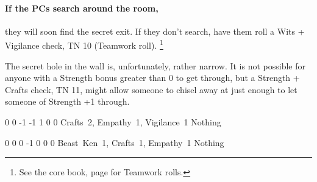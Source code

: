 \begin{multicols}{2}
\paragraph{If the PCs search around the room,}
they will soon find the secret exit.
If they don't search, have them roll a Wits + Vigilance check, TN 10 (Teamwork roll).%
\footnote{See the core book, page \pageref{teamwork} for Teamwork rolls.}

The secret hole in the wall is, unfortunately, rather narrow.
It is not possible for anyone with a Strength bonus greater than 0 to get through, but a Strength + Crafts check, TN 11, might allow someone to chisel away at just enough to let someone of Strength +1 through.

{0}%
{0}%
{{-1}%
{-1}%
{1}}%
{0}%
{0}%
{Crafts~2, Empathy~1, Vigilance~1}%
{Nothing}%
{}

{0}%
{0}%
{{0}%
{-1}%
{0}}%
{0}%
{0}%
{Beast~Ken~1, Crafts~1, Empathy~1}%
{Nothing}%
{}

\end{multicols}

